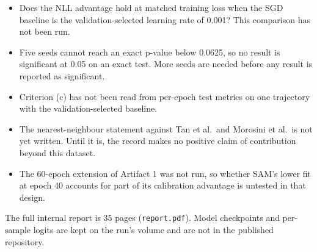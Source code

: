 \documentclass[10pt,letterpaper]{article}
\begin{document}
\begin{itemize}
\item Does the NLL advantage hold at matched training loss when the SGD baseline is the validation-selected learning rate of 0.001? This comparison has not been run.
\item Five seeds cannot reach an exact p-value below 0.0625, so no result is significant at 0.05 on an exact test. More seeds are needed before any result is reported as significant.
\item Criterion (c) has not been read from per-epoch test metrics on one trajectory with the validation-selected baseline.
\item The nearest-neighbour statement against Tan et al.\ and Morosini et al.\ is not yet written. Until it is, the record makes no positive claim of contribution beyond this dataset.
\item The 60-epoch extension of Artifact 1 was not run, so whether SAM's lower fit at epoch 40 accounts for part of its calibration advantage is untested in that design.
\end{itemize}

\vspace{0.5em}
\noindent The full internal report is 35 pages (\texttt{report.pdf}). Model checkpoints and per-sample logits are kept on the run's volume and are not in the published repository.
\end{document}
